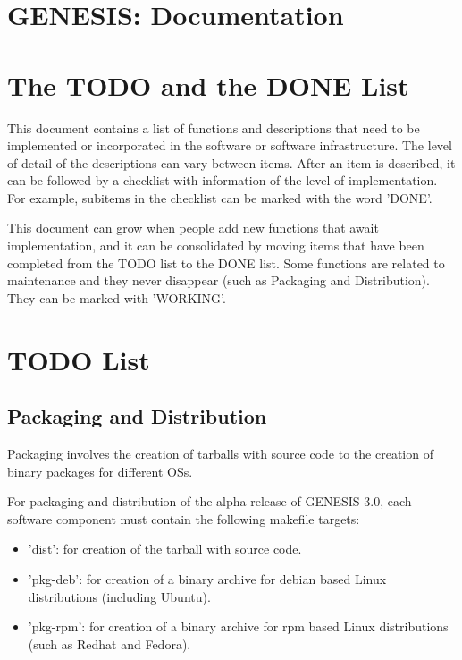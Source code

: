 \documentclass[12pt]{article}
\begin{document}
\section*{GENESIS: Documentation}

\section{The TODO and the DONE List}

This document contains a list of functions and descriptions that need
to be implemented or incorporated in the software or software
infrastructure.  The level of detail of the descriptions can vary
between items.  After an item is described, it can be followed by a
checklist with information of the level of implementation.  For
example, subitems in the checklist can be marked with the word 'DONE'.

This document can grow when people add new functions that await
implementation, and it can be consolidated by moving items that have
been completed from the TODO list to the DONE list.  Some functions
are related to maintenance and they never disappear (such as Packaging
and Distribution).  They can be marked with 'WORKING'.


\section{TODO List}

\subsection{Packaging and Distribution}

Packaging involves the creation of tarballs with source code to the
creation of binary packages for different OSs.

For packaging and distribution of the alpha release of GENESIS 3.0,
each software component must contain the following makefile targets:

\begin{itemize}
\item 'dist': for creation of the tarball with source code.
\item 'pkg-deb': for creation of a binary archive for debian based
  Linux distributions (including Ubuntu).
\item 'pkg-rpm': for creation of a binary archive for rpm based Linux
  distributions (such as Redhat and Fedora).
\end{itemize}
\end{document}
